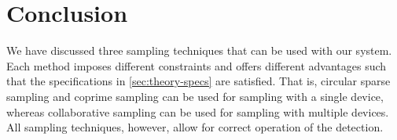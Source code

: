 \documentclass[a4paper, openany, oneside]{memoir}
\begin{document}
\section{Conclusion}
We have discussed three sampling techniques that can be used with our system. Each method imposes different constraints and offers different advantages such that the specifications in \cref{sec:theory-specs} are satisfied. That is, circular sparse sampling and coprime sampling can be used for sampling with a single device, whereas collaborative sampling can be used for sampling with multiple devices.  All sampling techniques, however, allow for correct operation of the detection.
\end{document}
